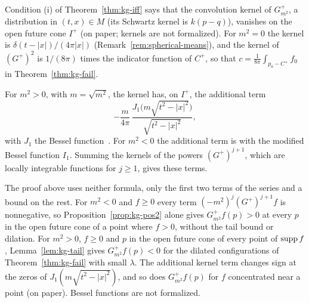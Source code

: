 \begin{extra}
\begin{remark}[Kernels]\label{rem:kg-kernels}
Condition (i) of Theorem~\ref{thm:kg-iff} says that the convolution kernel of $G^+_{m^2}$, a
distribution in $(t,x)\in M$ (its Schwartz kernel is $k(p-q)$), vanishes on the open future cone
$I^+$ (on paper; kernels are not formalized). For $m^2=0$ the kernel is $\delta(t-|x|)/(4\pi|x|)$ (Remark~\ref{rem:spherical-means}),
and the kernel of $(G^+)^2$ is $1/(8\pi)$ times the indicator function of $C^+$, so that
$c=\frac1{8\pi}\int_{p_0-C^+}f_0$ in Theorem~\ref{thm:kg-fail}.

For $m^2>0$, with $m=\sqrt{m^2}$, the kernel has, on $I^+$, the additional term
\[
-\frac m{4\pi}\,\frac{J_1\bigl(m\sqrt{t^2-|x|^2}\bigr)}{\sqrt{t^2-|x|^2}},
\]
with $J_1$ the Bessel function~. For $m^2<0$ the additional term is
with the modified Bessel function $I_1$. Summing the kernels of the powers $(G^+)^{j+1}$, which are locally integrable
functions for $j\ge1$, gives these terms.

The proof above uses neither formula, only the first two terms of the series and a bound on the
rest. For $m^2<0$ and $f\ge0$ every term $(-m^2)^j(G^+)^{j+1}f$ is nonnegative, so
Proposition~\ref{prop:kg-pos2} alone gives $G^+_{m^2}f(p)>0$ at every $p$ in the open future cone of
a point where $f>0$, without the tail bound or dilation. For $m^2>0$, $f\ge0$ and $p$ in the open
future cone of every point of $\operatorname{supp} f$, Lemma~\ref{lem:kg-tail} gives $G^+_{m^2}f(p)<0$ for the
dilated configurations of Theorem~\ref{thm:kg-fail} with small $\lambda$. The additional kernel term
changes sign at the zeros of $J_1(m\sqrt{t^2-|x|^2})$, and so does $G^+_{m^2}f(p)$ for $f$ concentrated
near a point (on paper). Bessel functions are not formalized.
\end{remark}
\end{extra}
\endgroup
